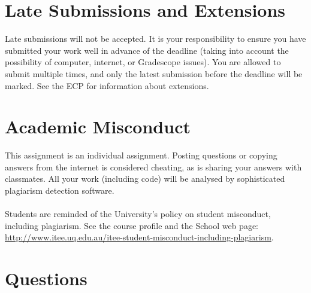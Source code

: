 \documentclass[a4,13pt]{extarticle}
\begin{document}
\section*{Late Submissions and Extensions}
Late submissions will not be accepted. It is your responsibility to ensure you have submitted your
work well in advance of the deadline (taking into account the possibility of computer, internet, or Gradescope
issues). You are allowed to submit multiple times, and only the latest submission before the deadline will be marked. See the ECP for information about extensions.
\section*{Academic Misconduct}
This assignment is an individual assignment. Posting questions or copying answers from the internet is considered cheating, as is sharing your answers with classmates. All your work (including code) will be analysed by sophisticated plagiarism detection software. \\\\
Students are reminded of the University’s policy on student misconduct, including plagiarism. See
the course profile and the School web page:
\url{http://www.itee.uq.edu.au/itee-student-misconduct-including-plagiarism}.\\

\newpage 

\fi 
\section*{Questions}
\end{document}
